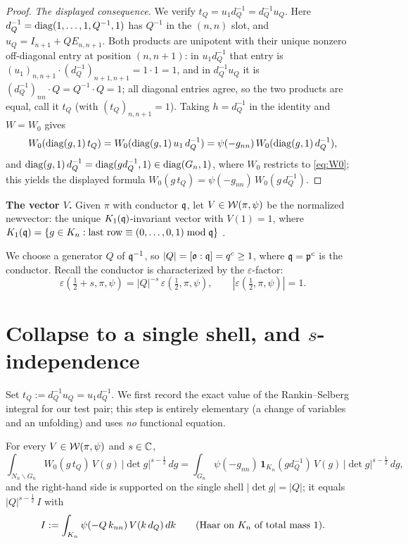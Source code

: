 \begin{proof}
\emph{The displayed consequence.}
We verify $t_Q=u_1 d_Q^{-1}=d_Q^{-1}u_Q$. Here $d_Q^{-1}=\operatorname{diag}(1,\dots,1,Q^{-1},1)$ has
$Q^{-1}$ in the $(n,n)$ slot, and $u_Q=I_{n+1}+QE_{n,n+1}$. Both products are unipotent with their
unique nonzero off-diagonal entry at position $(n,n+1)$: in $u_1 d_Q^{-1}$ that entry is
$(u_1)_{n,n+1}\cdot(d_Q^{-1})_{n+1,n+1}=1\cdot1=1$, and in $d_Q^{-1}u_Q$ it is
$(d_Q^{-1})_{nn}\cdot Q=Q^{-1}\cdot Q=1$; all diagonal entries agree, so the two products are equal,
call it $t_Q$ \textup{(}with $(t_Q)_{n,n+1}=1$\textup{)}. Taking $h=d_Q^{-1}$ in the identity and
$W=W_0$ gives
\[
W_0(\operatorname{diag}(g,1)\,t_Q)=W_0(\operatorname{diag}(g,1)\,u_1\,d_Q^{-1})=\psi(-g_{nn})\,W_0(\operatorname{diag}(g,1)\,d_Q^{-1}),
\]
and $\operatorname{diag}(g,1)\,d_Q^{-1}=\operatorname{diag}(g d_Q^{-1},1)\in\operatorname{diag}(G_n,1)$, where $W_0$ restricts to
\eqref{eq:W0}; this yields the displayed formula
$W_0(g\,t_Q)=\psi(-g_{nn})\,W_0(g\,d_Q^{-1})$.
\end{proof}

\noindent\textbf{The vector $V$.} Given $\pi$ with conductor $\mathfrak{q}$, let
$V\in\mathcal{W}(\pi,\psi)$ be the normalized newvector: the unique $K_1(\mathfrak{q})$-invariant
vector with $V(1)=1$, where
$K_1(\mathfrak{q})=\{g\in K_n:\text{last row}\equiv(0,\dots,0,1)\bmod\mathfrak{q}\}$
\cite{JPSS81,Matringe}.

We choose a generator $Q$ of $\mathfrak{q}^{-1}$, so $|Q|=[\mathfrak{o}:\mathfrak{q}]=q^{c}\ge1$, where
$\mathfrak{q}=\mathfrak{p}^{c}$ is the conductor. Recall the
conductor is characterized by the $\varepsilon$-factor:
\begin{equation}\label{eq:eps}
\varepsilon(\tfrac12+s,\pi,\psi)=|Q|^{-s}\,\varepsilon(\tfrac12,\pi,\psi),
\qquad |\varepsilon(\tfrac12,\pi,\psi)|=1 .
\end{equation}


\section*{Collapse to a single shell, and $s$-independence}

Set $t_Q:=d_Q^{-1}u_Q=u_1 d_Q^{-1}$. We first record the exact value of the
Rankin--Selberg integral for our test pair; this step is entirely elementary
\textup{(}a change of variables and an unfolding\textup{)} and uses \emph{no} functional
equation.

\begin{qtwolemma}\label{lem:unfold}
For every $V\in\mathcal{W}(\pi,\psi)$ and $s\in\mathbb{C}$,
\[
\int_{N_n\backslash G_n} W_0(g\,t_Q)\,V(g)\,|\det g|^{s-\frac12}\,dg
=\int_{G_n}\psi(-g_{nn})\,\mathbf 1_{K_n}(g d_Q^{-1})\,V(g)\,|\det g|^{s-\frac12}\,dg ,
\]
and the right-hand side is supported on the single shell $|\det g|=|Q|$; it equals
$|Q|^{s-\frac12}\,I$ with
\begin{equation}\label{eq:Idef}
I:=\int_{K_n}\psi(-Q\,k_{nn})\,V(k\,d_Q)\,dk\qquad\textup{(Haar on $K_n$ of total mass $1$).}
\end{equation}
\end{qtwolemma}


